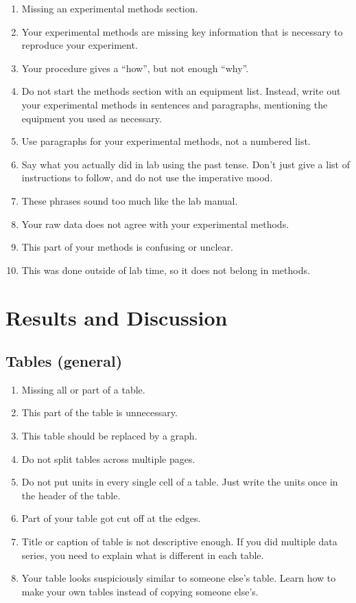 \documentclass[10pt,letterpaper]{article}
\begin{document}
\begin{multicols}{2}
\begin{enumerate}[start=40]
  \item Missing an experimental methods section.
  \item Your experimental methods are missing key information
    that is necessary to reproduce your experiment.
  \item Your procedure gives a ``how'', but not enough ``why''.
  \item Do not start the methods section with an equipment list.
    Instead, write out your experimental methods in sentences and paragraphs,
    mentioning the equipment you used as necessary.
  \item Use paragraphs for your experimental methods, not a numbered list.
  \item Say what you actually did in lab using the past tense.
    Don't just give a list of instructions to follow,
    and do not use the imperative mood.
  \item These phrases sound too much like the lab manual.
  \item Your raw data does not agree with your experimental methods.
  \item This part of your methods is confusing or unclear.
  \item This was done outside of lab time,
    so it does not belong in methods.
\end{enumerate}

\section{Results and Discussion}

\subsection*{Tables (general)}

\begin{enumerate}[start=50]
  \item Missing all or part of a table.
  \item This part of the table is unnecessary.
  \item This table should be replaced by a graph.
  \item Do not split tables across multiple pages.
  \item Do not put units in every single cell of a table.
    Just write the units once in the header of the table.
  \item Part of your table got cut off at the edges.
  \item Title or caption of table is not descriptive enough.
    If you did multiple data series,
    you need to explain what is different in each table.
  \item Your table looks suspiciously similar to someone else's table.
    Learn how to make your own tables instead of copying someone else's.
\end{enumerate}


\end{multicols}
\end{document}
